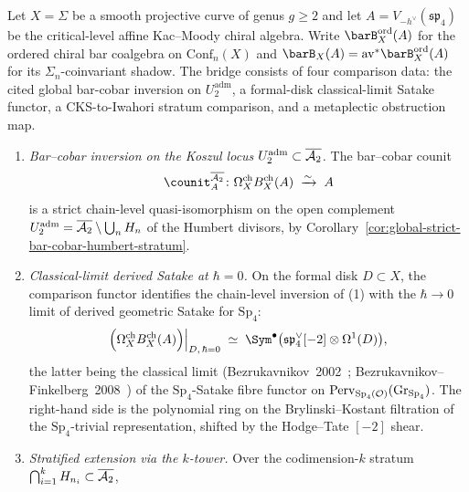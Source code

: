 \begin{conjecture}[Octachotomy--derived-Satake bridge at $g=2$;
\ClaimStatusConjectured]
\label{thm:dl-octachotomy-satake-bridge}
%
%
%
Let $X=\Sigma$ be a smooth projective curve of genus $g\geq 2$ and
let $A=V_{-h^\vee}(\mathfrak{sp}_4)$ be the critical-level affine
Kac--Moody chiral algebra. Write
$\barB^{\mathrm{ord}}_X(A)$ for the ordered chiral bar coalgebra on
$\mathrm{Conf}_n(X)$ and
$\barB_X(A)=\mathrm{av}^*\barB^{\mathrm{ord}}_X(A)$ for its
$\Sigma_n$-coinvariant shadow.
The bridge consists of four comparison data: the cited global
bar-cobar inversion on $U_2^{\mathrm{adm}}$, a formal-disk
classical-limit Satake functor, a CKS-to-Iwahori stratum comparison,
and a metaplectic obstruction map.
\begin{enumerate}[label=\textup{(\arabic*)}]
\item \emph{Bar--cobar inversion on the Koszul locus
$U_2^{\mathrm{adm}}\subset\overline{\mathcal{A}_2}$.} The bar--cobar counit
\[
 \counit_A^{\AbarTwo}\colon
 \Omega^{\mathrm{ch}}_X B^{\mathrm{ch}}_X(A)
 \;\xrightarrow{\sim}\;
 A
\]
is a strict chain-level quasi-isomorphism on the open complement
$U_2^{\mathrm{adm}}=\overline{\mathcal{A}_2}\setminus\bigcup_n H_n$ of the Humbert
divisors, by
Corollary~\textup{\ref{cor:global-strict-bar-cobar-humbert-stratum}}.
\item \emph{Classical-limit derived Satake at $\hbar=0$.} On the
formal disk $D\subset X$, the comparison functor identifies the
chain-level inversion of (1) with the $\hbar\to 0$ limit of derived
geometric Satake for $\mathrm{Sp}_4$:
\begin{equation}
\label{eq:dl-octa-sat-classical}
 \Bigl(\Omega^{\mathrm{ch}}_X B^{\mathrm{ch}}_X(A)\Bigr)\Big|_{D,\,\hbar=0}
 \;\simeq\;
 \Sym^\bullet\bigl(\mathfrak{sp}_4^\vee[-2]\otimes\Omega^1(D)\bigr),
\end{equation}
the latter being the classical limit
(Bezrukavnikov~2002~\cite{Bezrukavnikov2002};
Bezrukavnikov--Finkelberg~2008~\cite{BezrukavnikovFinkelberg2008}) of
the $\mathrm{Sp}_4$-Satake fibre functor on
$\mathrm{Perv}_{\mathrm{Sp}_4(\mathcal{O})}(\mathrm{Gr}_{\mathrm{Sp}_4})$.
The right-hand side is the polynomial ring on the
Brylinski--Kostant filtration of the $\mathrm{Sp}_4$-trivial
representation, shifted by the Hodge--Tate $[-2]$ shear.
\item \emph{Stratified extension via the $k$-tower.} Over the
codimension-$k$ stratum $\bigcap_{i=1}^k H_{n_i}\subset\overline{\mathcal{A}_2}$,

\end{enumerate}
\end{conjecture}
